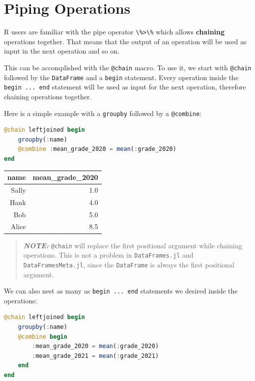 \documentclass[
  notoc %
]{tufte-book}
\newcommand{\passthrough}[1]{#1}
\begin{document}
\hypertarget{sec:dataframesmeta_chain}{%
\section{Piping Operations}\label{sec:dataframesmeta_chain}}

R users are familiar with the pipe operator
\passthrough{\lstinline!\%>\%!} which allows \textbf{chaining}
operations together. That means that the output of an operation will be
used as input in the next operation and so on.

This can be accomplished with the \passthrough{\lstinline!@chain!}
macro. To use it, we start with \passthrough{\lstinline!@chain!}
followed by the \passthrough{\lstinline!DataFrame!} and a
\passthrough{\lstinline!begin!} statement. Every operation inside the
\passthrough{\lstinline!begin ... end!} statement will be used as input
for the next operation, therefore chaining operations together.

Here is a simple example with a \passthrough{\lstinline!groupby!}
followed by a \passthrough{\lstinline!@combine!}:

\begin{lstlisting}[language=Julia]
@chain leftjoined begin
    groupby(:name)
    @combine :mean_grade_2020 = mean(:grade_2020)
end
\end{lstlisting}

\begin{longtable}[]{@{}rr@{}}
\toprule()
name & mean\_grade\_2020 \\
\midrule()
\endhead
Sally & 1.0 \\
Hank & 4.0 \\
Bob & 5.0 \\
Alice & 8.5 \\
\bottomrule()
\end{longtable}

\begin{quote}
\textbf{\emph{NOTE:}} \passthrough{\lstinline!@chain!} will replace the
first positional argument while chaining operations. This is not a
problem in \passthrough{\lstinline!DataFrames.jl!} and
\passthrough{\lstinline!DataFramesMeta.jl!}, since the
\passthrough{\lstinline!DataFrame!} is always the first positional
argument.
\end{quote}

We can also nest as many as \passthrough{\lstinline!begin ... end!}
statements we desired inside the operations:

\begin{lstlisting}[language=Julia]
@chain leftjoined begin
    groupby(:name)
    @combine begin
        :mean_grade_2020 = mean(:grade_2020)
        :mean_grade_2021 = mean(:grade_2021)
    end
end
\end{lstlisting}
\end{document}
